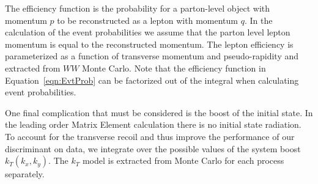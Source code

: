 The efficiency function is the probability for a parton-level object with momentum 
$p$ to be reconstructed as a lepton with momentum $q$. In the calculation of the event 
probabilities we assume that the parton level lepton momentum is equal to the reconstructed 
momentum. The lepton efficiency is parameterized as a function of transverse momentum and 
pseudo-rapidity and extracted from $WW$ Monte Carlo. 
Note that the efficiency function in Equation~\ref{eqn:EvtProb} can be factorized out of
the integral when calculating event probabilities.



One final complication that must be considered is the boost of the initial state.
In the leading order Matrix Element calculation there is no initial state radiation. 
To account for the transverse recoil and thus improve the performance of our discriminant
on data, we integrate over the possible values of the system boost $k_{T}(k_{x},k_{y})$. 
The $k_T$ model is extracted from Monte Carlo for each process separately. 


